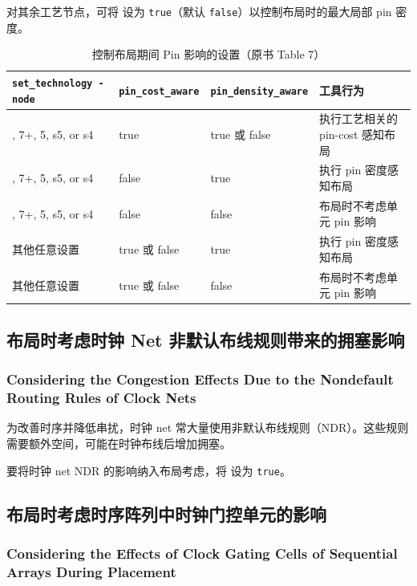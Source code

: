 对其余工艺节点，可将  设为 \texttt{true}（默认 \texttt{false}）以控制布局时的最大局部 pin 密度。

\begin{table}[htbp]
\centering
\caption{控制布局期间 Pin 影响的设置（原书 Table 7）}
\label{tab:ch2b-pin-effects}
\small
\begin{tabularx}{\textwidth}{@{}>{\raggedright\arraybackslash}p{}
  >{\ttfamily\raggedright\arraybackslash}p{}
  >{\ttfamily\raggedright\arraybackslash}p{}
  >{\raggedright\arraybackslash}X@{}}
\toprule
\raggedright\texttt{set\_technology -node} & \texttt{pin\_cost\_aware} & \texttt{pin\_density\_aware} & \textbf{工具行为} \\
\midrule
7, 7+, 5, s5, or s4 & true & true 或 false & 执行工艺相关的 pin-cost 感知布局 \\
7, 7+, 5, s5, or s4 & false & true & 执行 pin 密度感知布局 \\
7, 7+, 5, s5, or s4 & false & false & 布局时不考虑单元 pin 影响 \\
其他任意设置 & true 或 false & true & 执行 pin 密度感知布局 \\
其他任意设置 & true 或 false & false & 布局时不考虑单元 pin 影响 \\
\bottomrule
\end{tabularx}
\end{table}

\subsection{布局时考虑时钟 Net 非默认布线规则带来的拥塞影响}
\subsubsection*{Considering the Congestion Effects Due to the Nondefault Routing Rules of Clock Nets}

为改善时序并降低串扰，时钟 net 常大量使用非默认布线规则（NDR）。这些规则需要额外空间，可能在时钟布线后增加拥塞。

要将时钟 net NDR 的影响纳入布局考虑，将  设为 \texttt{true}。

\subsection{布局时考虑时序阵列中时钟门控单元的影响}
\subsubsection*{Considering the Effects of Clock Gating Cells of Sequential Arrays During Placement}

